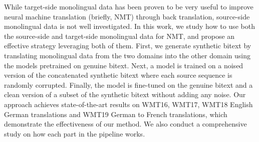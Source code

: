 While target-side monolingual data has been proven to be very useful to improve neural machine translation (briefly, NMT) through back translation, source-side monolingual data is not well investigated. In this work, we study how to use both the source-side and target-side monolingual data for NMT, and propose an effective strategy leveraging both of them. First, we generate synthetic bitext by translating monolingual data from the two domains into the other domain using the models pretrained on genuine bitext. Next, a model is trained on a noised version of the concatenated synthetic bitext where each source sequence is randomly corrupted. Finally, the model is fine-tuned on the genuine bitext and a clean version of a subset of the synthetic bitext without adding any noise. Our approach achieves state-of-the-art results on WMT16, WMT17, WMT18 English {\leftrightarrow} German translations and WMT19 German to French translations, which demonstrate the effectiveness of our method. We also conduct a comprehensive study on how each part in the pipeline works.